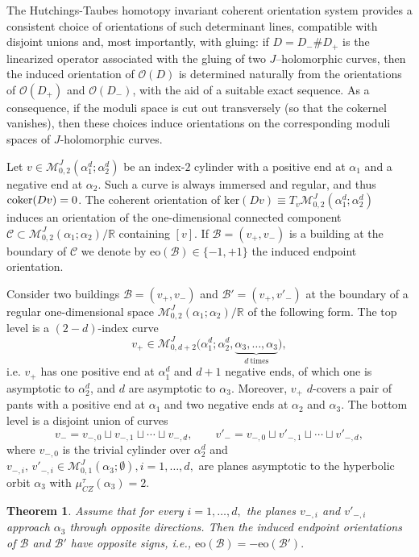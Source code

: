 \documentclass{amsart}
\newcommand{\R}{\mathbb{R}}
\newcommand{\M}{\mathcal{M}}
\newcommand{\Ker}{\mathrm{ker}}
\newcommand{\eo}{\mathrm{eo}}
\newtheorem{theorem}{Theorem}[section]
\newcommand{\CZ}{\mu_{CZ}^{\tau}}
\begin{document}
The Hutchings-Taubes homotopy invariant coherent orientation system provides a consistent choice of orientations of
such determinant lines, compatible with disjoint unions and, most importantly, with gluing: if
$D = D_{-} \# D_{+}$ is the linearized operator associated with the gluing of two
$J$--holomorphic curves, then the induced orientation of $\mathcal{O}(D)$ is determined naturally
from the orientations of $\mathcal{O}(D_{+})$ and $\mathcal{O}(D_{-})$, with the aid of a suitable exact sequence. As a consequence, if the moduli space is cut out transversely (so that the cokernel vanishes),
then these choices induce orientations on the corresponding moduli spaces of $J$-holomorphic curves.

Let $v\in \M^{J}_{0,2}(\alpha_{1}^d;\alpha_{2}^d)$ be an index-$2$ cylinder with a positive end at $\alpha_{1}$ and a negative end at
$\alpha_{2}$. Such a curve is always immersed and regular, and thus ${\rm coker}(Dv)=0$. The coherent orientation of $\Ker(Dv)\equiv T_v\M^{J}_{0,2}(\alpha_{1}^d;\alpha_{2}^d)$ induces an
orientation of the one-dimensional connected component
$\mathcal C \subset \M^{J}_{0,2}(\alpha_{1};\alpha_{2})/\R
$
containing $[v]$. If $\mathcal B=(v_{+},v_{-})$ is a building at the boundary of $\mathcal C$ we denote
by $\eo(\mathcal B)\in\{-1,+1\}$ the induced endpoint orientation.

Consider two buildings $\mathcal B= (v_{+},v_{-})$ and $\mathcal B'=(v_{+},v'_{-})$ at the boundary of a regular
one-dimensional space $\M^{J}_{0,2}(\alpha_{1};\alpha_{2})/\R$ of the following form.
The top level is a $(2-d)$-index curve
$$
v_{+}\in \M^{J}_{0,d+2}\bigl(\alpha_{1}^d;\alpha_{2}^d,\underbrace{\alpha_{3},\ldots,\alpha_{3}}_{d\ \text{times}}\bigr),
$$
i.e. $v_{+}$ has one positive end at $\alpha_1^d$ and $d+1$ negative ends, of
which one is asymptotic to $\alpha_{2}^d$, and $d$ are asymptotic to $\alpha_{3}$. Moreover, $v_+$ $d$-covers a pair of pants with a positive end at $\alpha_1$ and two  negative ends at $\alpha_2$ and $\alpha_3$.
The bottom level is a disjoint union of curves
$$
v_{-}=v_{-,0}\sqcup v_{-,1}\sqcup\cdots\sqcup v_{-,d},
\qquad
v'_{-}=v_{-,0}\sqcup v'_{-,1}\sqcup\cdots\sqcup v'_{-,d},
$$
where $v_{-,0}$ is the trivial cylinder over $\alpha_{2}^d$ and
$
v_{-,i},\,v'_{-,i}\in \M^{J}_{0,1}(\alpha_{3};\emptyset),i=1,\dots,d,
$
are planes asymptotic to the hyperbolic orbit $\alpha_{3}$ with $\CZ(\alpha_{3})=2$.


\begin{theorem}\label{thm: coherent_orientations}
Assume that for every $i=1,\dots,d,$ the planes $v_{-,i}$ and $v'_{-,i}$ approach
$\alpha_{3}$ through opposite directions.
Then the induced endpoint orientations of $\mathcal B$ and $\mathcal B'$ have opposite signs, i.e., 
$\eo(\mathcal B)=-\eo(\mathcal B').
$
\end{theorem}
\end{document}
